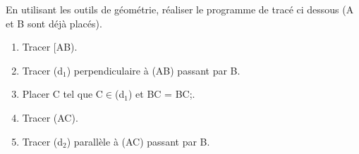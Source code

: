 \documentclass[exercice]{thedocument}%
\begin{document}
%
En utilisant les outils de géométrie, réaliser le programme de tracé ci dessous (A et B sont déjà placés).\vskip15pt\noindent
\begin{enumerate}
    \item Tracer [AB).
    \item Tracer (d$_1$) perpendiculaire à (AB) passant par B.
    \item Placer C tel que C$\in$(d$_1$) et BC = \<BC;.
    \item Tracer (AC).
    \item Tracer (d$_2$) parallèle à (AC) passant par B.
\end{enumerate}
\vskip120pt\hskip50pt
\begin{center}
\end{center}
\end{document}
